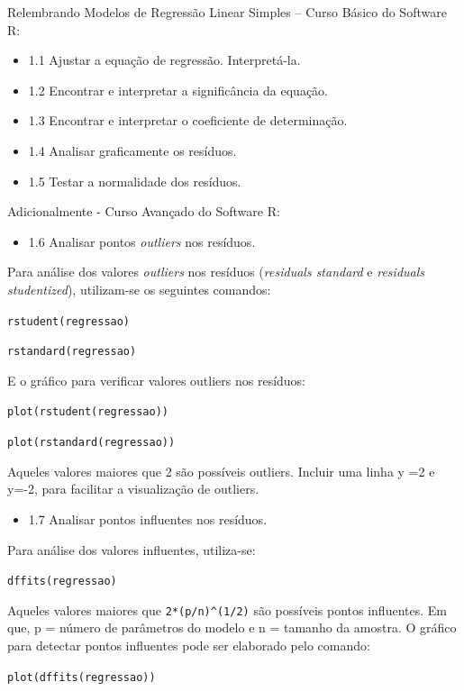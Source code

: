 \documentclass[12pt,brazil,oneside]{book}
\providecommand{\tightlist}{%
  \setlength{\itemsep}{0pt}\setlength{\parskip}{0pt}}
\begin{document}
Relembrando Modelos de Regressão Linear Simples -- Curso Básico do Software R:

\begin{itemize}
\tightlist
\item
  1.1 Ajustar a equação de regressão. Interpretá-la.
\item
  1.2 Encontrar e interpretar a significância da equação.
\item
  1.3 Encontrar e interpretar o coeficiente de determinação.
\item
  1.4 Analisar graficamente os resíduos.
\item
  1.5 Testar a normalidade dos resíduos.
\end{itemize}

Adicionalmente - Curso Avançado do Software R:

\begin{itemize}
\tightlist
\item
  1.6 Analisar pontos \emph{outliers} nos resíduos.
\end{itemize}

Para análise dos valores \emph{outliers} nos resíduos (\emph{residuals standard} e \emph{residuals studentized}), utilizam-se os seguintes comandos:

\texttt{rstudent(regressao)}

\texttt{rstandard(regressao)}

E o gráfico para verificar valores outliers nos resíduos:

\texttt{plot(rstudent(regressao))}

\texttt{plot(rstandard(regressao))}

Aqueles valores maiores que \textbar{}2\textbar{} são possíveis outliers. Incluir uma linha y =2 e y=-2, para facilitar a visualização de outliers.

\begin{itemize}
\tightlist
\item
  1.7 Analisar pontos influentes nos resíduos.
\end{itemize}

Para análise dos valores influentes, utiliza-se:

\texttt{dffits(regressao)}

Aqueles valores maiores que \texttt{2*(p/n)\^{}(1/2)} são possíveis pontos influentes. Em que, p = número de parâmetros do modelo e n = tamanho da amostra. O gráfico para detectar pontos influentes pode ser elaborado pelo comando:

\texttt{plot(dffits(regressao))}
\end{document}
